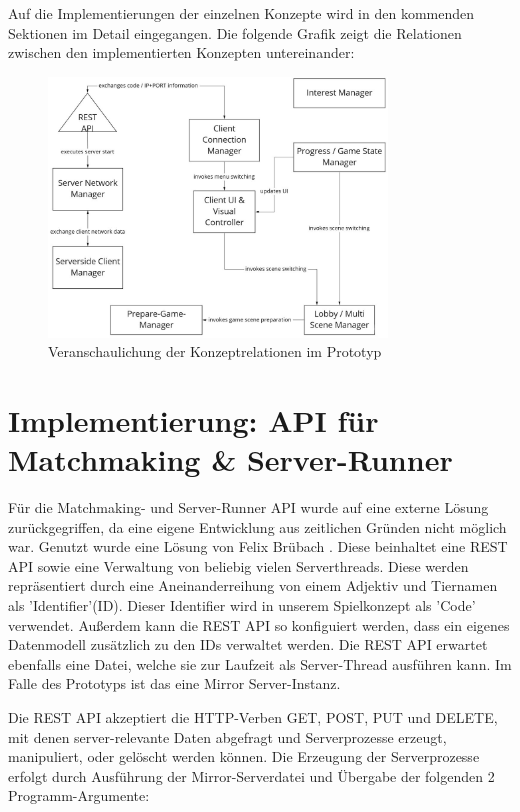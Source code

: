 Auf die Implementierungen der einzelnen Konzepte wird in den kommenden Sektionen im Detail eingegangen. Die folgende Grafik zeigt die Relationen zwischen den implementierten Konzepten untereinander:

\begin{figure}[H]
	\centering
	\includegraphics[width=90mm]{images/concept_relations.jpg}
	\caption[Architektur Konzept Relationen]{Veranschaulichung der Konzeptrelationen im Prototyp}
	\label{pic:concept_relations}
\end{figure}

\section{Implementierung: API für Matchmaking \& Server-Runner}

Für die Matchmaking- und Server-Runner API wurde auf eine externe Lösung zurückgegriffen, da eine eigene Entwicklung aus zeitlichen Gründen nicht möglich war. Genutzt wurde eine Lösung von Felix Brübach \cite{GitHub.20.02.2022}. Diese beinhaltet eine REST API sowie eine Verwaltung von beliebig vielen Serverthreads. Diese werden repräsentiert durch eine Aneinanderreihung von einem Adjektiv und Tiernamen als 'Identifier'(ID). Dieser Identifier wird in unserem Spielkonzept als 'Code' verwendet. Außerdem kann die REST API so konfiguiert werden, dass ein eigenes Datenmodell zusätzlich zu den IDs verwaltet werden. Die REST API erwartet ebenfalls eine Datei, welche sie zur Laufzeit als Server-Thread ausführen kann. Im Falle des Prototyps ist das eine Mirror Server-Instanz.

Die REST API akzeptiert die HTTP-Verben GET, POST, PUT und DELETE, mit denen server-relevante Daten abgefragt und Serverprozesse erzeugt, manipuliert, oder gelöscht werden können. Die Erzeugung der Serverprozesse erfolgt durch Ausführung der Mirror-Serverdatei und Übergabe der folgenden 2 Programm-Argumente:

